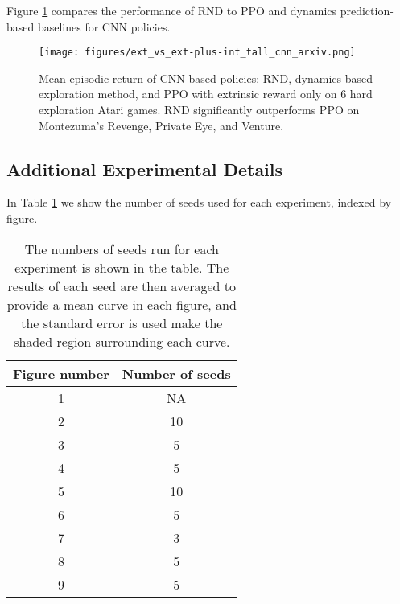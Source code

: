 \documentclass{article} \usepackage[dvipsnames]{xcolor}
\begin{document}
Figure \ref{fig:ext_comparison_cnn} compares the performance of RND to PPO and dynamics prediction-based baselines for CNN policies.

\begin{figure}[h!]
\centering
\texttt{[image: figures/ext\_vs\_ext-plus-int\_tall\_cnn\_arxiv.png]}
\caption{Mean episodic return of CNN-based policies: RND, dynamics-based exploration method, and PPO with extrinsic reward only on 6 hard exploration Atari games. RND significantly outperforms PPO on Montezuma's Revenge, Private Eye, and Venture.}
\label{fig:ext_comparison_cnn}
\vspace*{-8pt}
\end{figure}
\subsection{Additional Experimental Details}
\label{sec:additional_details}
In Table \ref{table:seeds} we show the number of seeds used for each experiment, indexed by figure.

\begin{table}[!ht]
\centering
\begin{tabular}{c | c} 
 Figure number & Number of seeds  \\ [0.5ex] 
 \hline
 1 & NA  \\
 2 & 10  \\
 3 & 5  \\
 4 & 5  \\
 5 & 10  \\
 6 & 5  \\
 7 & 3  \\
 8 & 5  \\
 9 & 5  \\
\end{tabular}
\caption{The numbers of seeds run for each experiment is shown in the table. The results of each seed are then averaged to provide a mean curve in each figure, and the standard error is used make the shaded region surrounding each curve.}
\label{table:seeds}
\end{table}
\end{document}
